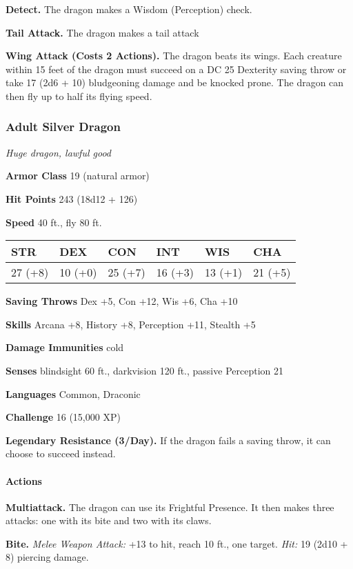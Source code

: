 \documentclass[
]{article}
\begin{document}
\textbf{Detect.} The dragon makes a Wisdom (Perception) check.

\textbf{Tail Attack.} The dragon makes a tail attack

\textbf{Wing Attack (Costs 2 Actions).} The dragon beats its wings. Each
creature within 15 feet of the dragon must succeed on a DC 25 Dexterity
saving throw or take 17 (2d6 + 10) bludgeoning damage and be knocked
prone. The dragon can then fly up to half its flying speed.

\hypertarget{adult-silver-dragon}{%
\subsubsection{Adult Silver Dragon}\label{adult-silver-dragon}}

\emph{Huge dragon, lawful good}

\textbf{Armor Class} 19 (natural armor)

\textbf{Hit Points} 243 (18d12 + 126)

\textbf{Speed} 40 ft., fly 80 ft.

\begin{longtable}[]{@{}llllll@{}}
\toprule
STR & DEX & CON & INT & WIS & CHA\tabularnewline
\midrule
\endhead
27 (+8) & 10 (+0) & 25 (+7) & 16 (+3) & 13 (+1) & 21 (+5)\tabularnewline
\bottomrule
\end{longtable}

\textbf{Saving Throws} Dex +5, Con +12, Wis +6, Cha +10

\textbf{Skills} Arcana +8, History +8, Perception +11, Stealth +5

\textbf{Damage Immunities} cold

\textbf{Senses} blindsight 60 ft., darkvision 120 ft., passive
Perception 21

\textbf{Languages} Common, Draconic

\textbf{Challenge} 16 (15,000 XP)

\textbf{Legendary Resistance (3/Day).} If the dragon fails a saving
throw, it can choose to succeed instead.

\hypertarget{actions-60}{%
\paragraph{Actions}\label{actions-60}}

\textbf{Multiattack.} The dragon can use its Frightful Presence. It then
makes three attacks: one with its bite and two with its claws.

\textbf{Bite.} \emph{Melee Weapon Attack:} +13 to hit, reach 10 ft., one
target. \emph{Hit:} 19 (2d10 + 8) piercing damage.
\end{document}

